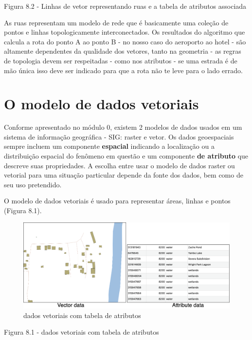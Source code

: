 \documentclass[
  portuguese,
]{krantz}
\begin{document}
Figura 8.2 - Linhas de vetor representando ruas e a tabela de atributos associada

As ruas representam um modelo de rede que é basicamente uma coleção de pontos e linhas topologicamente interconectados. Os resultados do algoritmo que calcula a rota do ponto A ao ponto B - no nosso caso do aeroporto ao hotel - são altamente dependentes da qualidade dos vetores, tanto na geometria - as regras de topologia devem ser respeitadas - como nos atributos - se uma estrada é de mão única isso deve ser indicado para que a rota não te leve para o lado errado.

\hypertarget{o-modelo-de-dados-vetoriais}{%
\section{O modelo de dados vetoriais}\label{o-modelo-de-dados-vetoriais}}

Conforme apresentado no módulo 0, existem 2 modelos de dados usados \hspace{0pt}\hspace{0pt}em um sistema de informação geográfica - SIG: raster e vetor. Os dados geoespaciais sempre incluem um componente \textbf{espacial} indicando a localização ou a distribuição espacial do fenômeno em questão e um componente \textbf{de atributo} que descreve suas propriedades. A escolha entre usar o modelo de dados raster ou vetorial para uma situação particular depende da fonte dos dados, bem como de seu uso pretendido.

O modelo de dados vetoriais é usado para representar áreas, linhas e pontos (Figura 8.1).

\begin{figure}
\centering
\includegraphics{media/modulo8/fig83.png}
\caption{dados vetoriais com tabela de atributos}
\end{figure}

Figura 8.1 - dados vetoriais com tabela de atributos
\end{document}
